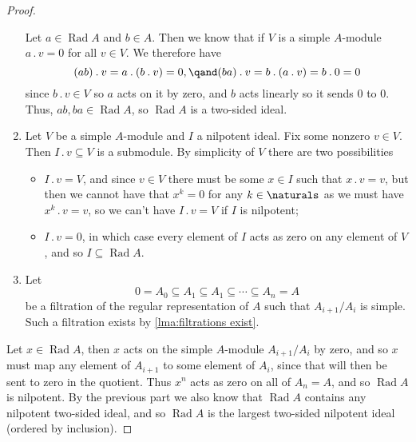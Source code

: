 \documentclass[fleqn]{NotesClass}
\newcommand{\action}{\mathbin{.}}
\DeclareMathOperator{\Rad}{Rad}
\begin{document}
\begin{prp}{}{}
\begin{proof}
\begin{enumerate}
                Let \(a \in \Rad A\) and \(b \in A\).
                Then we know that if \(V\) is a simple \(A\)-module \(a \action v = 0\) for all \(v \in V\).
                We therefore have
                \begin{equation}
                    (ab) \action v = a \action (b \action v) = 0, \qand (ba) \action v = b \action (a \action v) = b \action 0 = 0
                \end{equation}
                since \(b \action v \in V\) so \(a\) acts on it by zero, and \(b\) acts linearly so it sends \(0\) to \(0\).
                Thus, \(ab, ba \in \Rad A\), so \(\Rad A\) is a two-sided ideal.
                \item Let \(V\) be a simple \(A\)-module and \(I\) a nilpotent ideal.
                Fix some nonzero \(v \in V\).
                Then \(I \action v \subseteq V\) is a submodule.
                By simplicity of \(V\) there are two possibilities
                \begin{itemize}
                    \item \(I \action v = V\), and since \(v \in V\) there must be some \(x \in I\) such that \(x \action v = v\), but then we cannot have that \(x^k = 0\) for any \(k \in \naturals\) as we must have \(x^k \action v = v\), so we can't have \(I \action v = V\) if \(I\) is nilpotent;
                    \item \(I \action v = 0\), in which case every element of \(I\) acts as zero on any element of \(V\), and so \(I \subseteq \Rad A\).
                \end{itemize}
                \item Let 
                \begin{equation}
                    0 = A_0 \subseteq A_1 \subseteq A_1 \subseteq \dotsb \subseteq A_n = A
                \end{equation}
                be a filtration of the regular representation of \(A\) such that \(A_{i+1}/A_i\) is simple.
                Such a filtration exists by \cref{lma:filtrations exist}.
                
            \end{enumerate}Let \(x \in \Rad A\), then \(x\) acts on the simple \(A\)-module \(A_{i+1}/A_i\) by zero, and so \(x\) must map any element of \(A_{i+1}\) to some element of \(A_i\), since that will then be sent to zero in the quotient.
            Thus \(x^n\) acts as zero on all of \(A_n = A\), and so \(\Rad A\) is nilpotent.
            By the previous part we also know that \(\Rad A\) contains any nilpotent two-sided ideal, and so \(\Rad A\) is the largest two-sided nilpotent ideal (ordered by inclusion).
        \end{proof}
    \end{prp}
    
\end{document}

